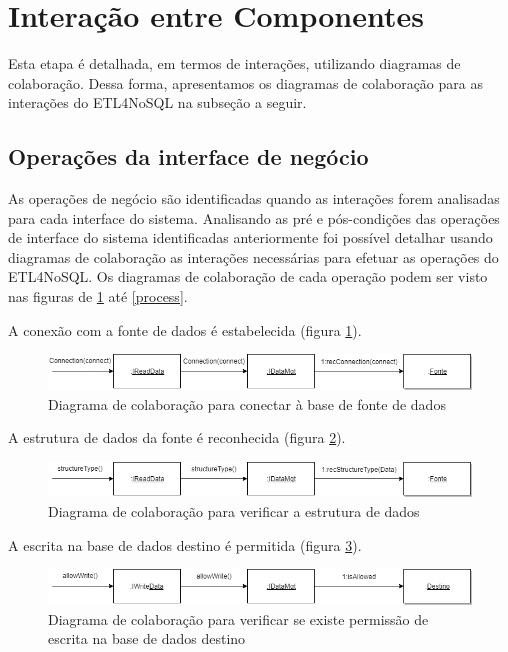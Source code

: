\section{Interação entre Componentes}

Esta etapa é detalhada, em termos de interações, utilizando diagramas de colaboração. Dessa forma, apresentamos os diagramas de colaboração para as interações do ETL4NoSQL na subseção a seguir.

\subsection{Operações da interface de negócio}

As operações de negócio são identificadas quando as interações forem analisadas para cada interface do sistema. Analisando as pré e pós-condições das operações de interface do sistema identificadas anteriormente foi possível detalhar usando diagramas de colaboração as interações necessárias para efetuar as operações do ETL4NoSQL. Os diagramas de colaboração de cada operação podem ser visto nas figuras de \ref{colaboracao1} até \ref{process}.

A conexão com a fonte de dados é estabelecida (figura \ref{colaboracao1}).

\begin{figure}[h!]
	\centering
	\includegraphics[scale=0.5]{fig/colaboracao1.png}
	\caption{Diagrama de colaboração para conectar à base de fonte de dados}
	\label{colaboracao1}
\end{figure}

A estrutura de dados da fonte é reconhecida (figura \ref{colaboracao2}).

\begin{figure}[h!]
	\centering
	\includegraphics[scale=0.5]{fig/colaboracao2.png}
	\caption{Diagrama de colaboração para verificar a estrutura de dados}
	\label{colaboracao2}
\end{figure}

A escrita na base de dados destino é permitida (figura \ref{colaboracao3}).

\begin{figure}[h!]
	\centering
	\includegraphics[scale=0.5]{fig/colaboracao3.png}
	\caption{Diagrama de colaboração para verificar se existe permissão de escrita na base de dados destino}
	\label{colaboracao3}
\end{figure}


